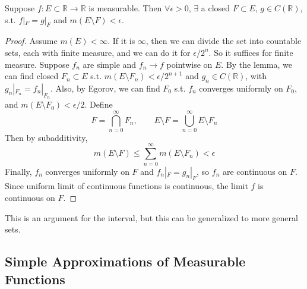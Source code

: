   \begin{theorem}[Luzin]
    Suppose $f: E \subset \mathbb{R} \to \mathbb{R}$ is measurable. Then $\forall \epsilon > 0$, $\exists$ a closed $F \subset E$, $g \in C(\mathbb{R})$, s.t. $f|_F = g |_F$ and $m(E \setminus F) < \epsilon$. 
  \end{theorem}
  \begin{proof}
    Assume $m(E) < \infty$. If it is $\infty$, then we can divide the set into countable sets, each with finite measure, and we can do it for $\epsilon/2^{n}$. So it suffices for finite measure. Suppose $f_n$ are simple and $f_n \to f$ pointwise on $E$. By the lemma, we can find closed $F_n \subset E$ s.t. $m(E \setminus F_n) < \epsilon / 2^{n+1}$ and $g_n \in C(\mathbb{R})$, with $g_n |_{F_n} = f_n |_{F_n}$. Also, by Egorov, we can find $F_0$ s.t. $f_n$ converges uniformly on $F_0$, and $m(E \setminus F_0) < \epsilon / 2$. Define 
    \begin{equation}
      F = \bigcap_{n=0}^\infty F_n, \qquad E \setminus F = \bigcup_{n=0}^\infty E \setminus F_n
    \end{equation}
    Then by subadditivity,
    \begin{equation}
      m(E \setminus F) \leq \sum_{n=0}^\infty m(E \setminus F_n) < \epsilon
    \end{equation}
    Finally, $f_n$ converges uniformly on $F$ and $f_n |_F = g_n |_F$, so $f_n$ are continuous on $F$. Since uniform limit of continuous functions is continuous, the limit $f$ is continuous on $F$. 
  \end{proof}

  This is an argument for the interval, but this can be generalized to more general sets. 

\subsection{Simple Approximations of Measurable Functions}

